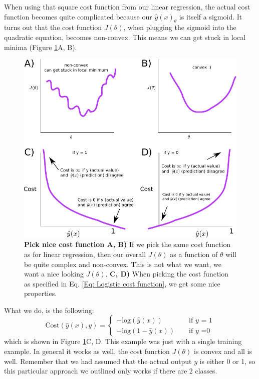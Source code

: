 \documentclass[a4paper, 10pt,hidelinks]{article}
\begin{document}
When using that square cost function from our linear regression, the actual cost function becomes quite complicated because our $\hat{y}(x)_{\theta}$ is itself a sigmoid. It turns out that the cost function $J(\theta)$, when plugging the sigmoid into the quadratic equation, becomes non-convex. This means we can get stuck in local minima (Figure \ref{Fig: Convex}A, B). 

\begin{figure}[h!]
\includegraphics[width=0.8\linewidth]{Convex}
\caption{\footnotesize{\textbf{Pick nice cost function A, B)} If we pick the same cost function as for linear regression, then our overall $J(\theta)$ as a function of $\theta$ will be quite complex and non-convex. This is not what we want, we want a nice looking $J(\theta)$. \textbf{C, D)} When picking the cost function as specified in Eq. \eqref{Eq: Logistic cost function}, we get some nice properties. }}
\label{Fig: Convex}
\end{figure}


What we do, is the following:
\begin{equation}\label{Eq: Logistic cost function}
\text{Cost}(\hat{y}(x), y) = 
\begin{cases}
-\text{log}(\hat{y}(x)) \quad \quad \,\, \;\;\; \;\; \text{if $y$ = 1} \\
-\text{log}(1 - \hat{y}(x)) \quad \quad \text{if $y$ =0}
\end{cases}
\end{equation}
which is shown in Figure \ref{Fig: Convex}C, D. This example was just with a single training example. In general it works as well, the cost function $J(\theta)$ is convex and all is well. Remember that we had assumed that the actual output $y$ is either 0 or 1, so this particular approach we outlined only works if there are 2 classes. %
\end{document}

